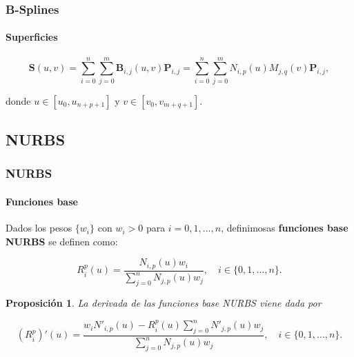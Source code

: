 \documentclass[compress]{beamer}
\newtheorem{proposition}[theorem]{Proposición}
\begin{document}
\begin{frame}
	\frametitle{B-Splines}
	\framesubtitle{Superficies} 
	\small
	\begin{definition}
		\begin{equation*}
		\mathbf{S}(u, v)= \sum_{i=0}^{n} \sum_{j=0}^{m} \mathbf{B}_{i,j}(u, v) \mathbf{P}_{i,j} = \sum_{i=0}^{n} \sum_{j=0}^{m} N_{i,p}(u) M_{j,q}(v) \mathbf{P}_{i,j},
		\end{equation*}

		donde $u \in [u_0, u_{n+p+1}]$ y $v \in [v_0, v_{m+q+1}]$.
	\end{definition}
\end{frame}

\subsection{NURBS}
\begin{frame}
	\frametitle{NURBS}
	\framesubtitle{Funciones base} 
	\begin{definition}
		Dados los pesos $\{w_i\}$ con $w_i>0$ para $i=0,1,..., n$, definimosas \textbf{funciones base NURBS} se definen como:

		\vspace{-0.15cm}

		\begin{equation*}
			\label{eq:NURBS_Curve_Basis}
			R_i^p(u)=\frac{N_{i,p}(u) w_i}{\sum_{j=0}^{n} N_{j,p}(u) w_j},\quad i \in \{0,1, \dots , n\}.
		\end{equation*}

		\vspace{-0.15cm}
	\end{definition}

	\begin{proposition}
		La derivada de las funciones base NURBS viene dada por
		
		\vspace{-0.35cm}
		
		$$(R_i^p)'(u) = \frac{w_i N'_{i,p}(u) - R_i^p(u) \sum_{j=0}^{n} N'_{j,p}(u) w_j}{\sum_{j=0}^{n} N_{j,p}(u) w_j},\quad i \in \{0,1, \dots , n\}.$$
	
	\end{proposition}
\end{frame}
\end{document}
